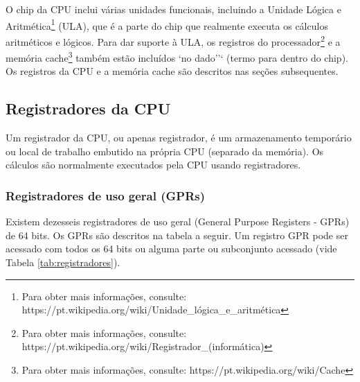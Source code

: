O chip da CPU inclui várias unidades funcionais, incluindo a Unidade Lógica e Aritmética\footnote{Para obter mais informações, consulte: https://pt.wikipedia.org/wiki/Unidade\_lógica\_e\_aritmética} (ULA), que é a parte do chip que realmente executa os cálculos aritméticos e lógicos. Para dar suporte à ULA, os registros do processador\footnote{Para obter mais informações, consulte: https://pt.wikipedia.org/wiki/Registrador\_(informática)} e a memória cache\footnote{Para obter mais informações, consulte: https://pt.wikipedia.org/wiki/Cache} também estão incluídos `no dado''` (termo para dentro do chip). Os registros da CPU e a memória cache são descritos nas seções subsequentes.

\subsection{Registradores da CPU}
Um registrador da CPU, ou apenas registrador, é um armazenamento temporário ou local de trabalho embutido na própria CPU (separado da memória). Os cálculos são normalmente executados pela CPU usando registradores.

\subsubsection{Registradores de uso geral (GPRs)}
Existem dezesseis registradores de uso geral (General Purpose Registers - GPRs) de 64 bits. Os GPRs são descritos na tabela a seguir. Um registro GPR pode ser acessado com todos os 64 bits ou alguma parte ou subconjunto acessado (vide Tabela \ref{tab:registradores}).

